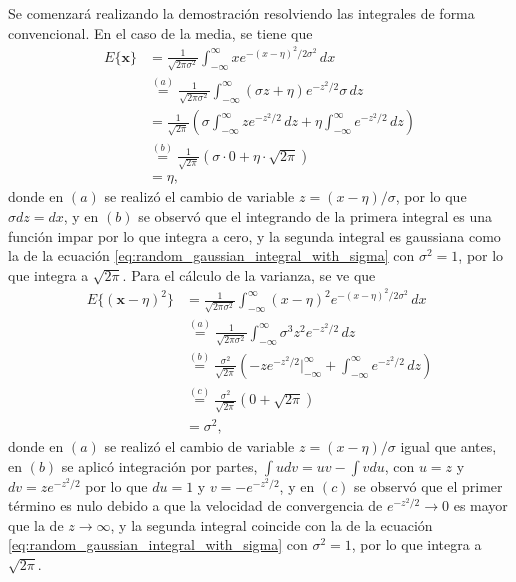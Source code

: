 \documentclass[a4paper]{report}
\newcommand{\x}{\mathbf{x}}
\begin{document}
Se comenzará realizando la demostración resolviendo las integrales de forma convencional. En el caso de la media, se tiene que
\begin{align*}
 E\{\x\}&=\frac{1}{\sqrt{2\pi\sigma^2}}\int_{-\infty}^{\infty}xe^{-(x-\eta)^2/2\sigma^2}\,dx\\
    &\overset{(a)}{=}\frac{1}{\sqrt{2\pi\sigma^2}}\int_{-\infty}^{\infty}(\sigma z+\eta)e^{-z^2/2}\sigma\,dz\\
    &=\frac{1}{\sqrt{2\pi}}\left(\sigma\int_{-\infty}^{\infty}ze^{-z^2/2}\,dz+\eta\int_{-\infty}^{\infty}e^{-z^2/2}\,dz\right)\\
    &\overset{(b)}{=}\frac{1}{\sqrt{2\pi}}\left(\sigma\cdot 0+\eta\cdot \sqrt{2\pi}\right)\\
    &=\eta,
\end{align*}
donde en \((a)\) se realizó el cambio de variable \(z=(x-\eta)/\sigma\), por lo  que \(\sigma dz=dx\), y en \((b)\) se observó que el integrando de la primera integral es una función impar por lo que integra a cero, y la segunda integral es gaussiana como la  de la ecuación \ref{eq:random_gaussian_integral_with_sigma} con \(\sigma^2=1\), por lo que integra a \(\sqrt{2\pi}\). Para el cálculo de la varianza, se ve que
\begin{align*}
 E\{(\x-\eta)^2\}&=\frac{1}{\sqrt{2\pi\sigma^2}}\int_{-\infty}^{\infty}(x-\eta)^2e^{-(x-\eta)^2/2\sigma^2}\,dx\\
 &\overset{(a)}{=}\frac{1}{\sqrt{2\pi\sigma^2}}\int_{-\infty}^{\infty}\sigma^3z^2e^{-z^2/2}\,dz\\
 &\overset{(b)}{=}\frac{\sigma^2}{\sqrt{2\pi}}\left(-ze^{-z^2/2}\bigg|_{-\infty}^{\infty}  +\int_{-\infty}^{\infty}e^{-z^2/2}\,dz\right)\\
 &\overset{(c)}{=}\frac{\sigma^2}{\sqrt{2\pi}}\left(0+\sqrt{2\pi}\right)\\
 &=\sigma^2,
\end{align*}
donde en \((a)\) se realizó el cambio de variable \(z=(x-\eta)/\sigma\) igual que antes, en \((b)\) se aplicó integración por partes, \(\int udv=uv-\int vdu\), con \(u=z\) y \(dv=ze^{-z^2/2}\) por lo que \(du=1\) y \(v=-e^{-z^2/2}\), y en \((c)\) se observó que el primer término es nulo debido a que la velocidad de convergencia de \(e^{-z^2/2}\to0\) es mayor que la de \(z\to\infty\), y la segunda integral coincide con la de la ecuación \ref{eq:random_gaussian_integral_with_sigma} con \(\sigma^2=1\), por lo que integra a \(\sqrt{2\pi}\).
\end{document}
